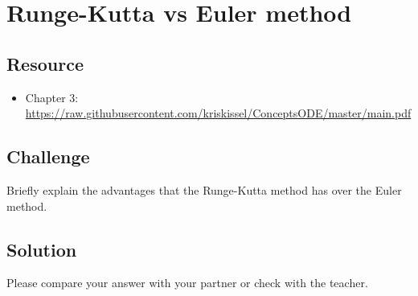 \newpage
\section{Runge-Kutta vs Euler method}

\subsection*{Resource}
\begin{itemize}
    \item Chapter 3: \url{https://raw.githubusercontent.com/kriskissel/ConceptsODE/master/main.pdf}
\end{itemize}

\subsection*{Challenge}
Briefly explain the advantages that the Runge-Kutta method has over the Euler method.

\subsection*{Solution}
Please compare your answer with your partner or check with the teacher.
